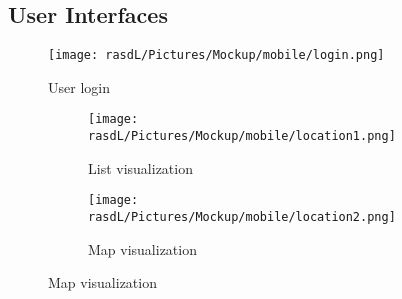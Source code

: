 \subsection{User Interfaces}

\begin{figure}[H]
\texttt{[image: rasdL/Pictures/Mockup/mobile/login.png]}
\centering
\captionsetup{labelformat=simple}
\caption{User login}
\end{figure}


\begin{figure}
  \begin{subfigure}[b]{0.4\textwidth}
    \texttt{[image: rasdL/Pictures/Mockup/mobile/location1.png]}
    \centering
    \captionsetup{labelformat=empty}
    \caption{List visualization}
    \label{fig:1}
  \end{subfigure}
  \begin{subfigure}[b]{0.4\textwidth}
    \texttt{[image: rasdL/Pictures/Mockup/mobile/location2.png]}
    \captionsetup{labelformat=empty}
    \caption{Map visualization}
    \label{fig:2}
  \end{subfigure}
\end{figure}




\iffalse

\begin{figure}[h]
\texttt{[image: usecase]}
\centering
\end{figure}

\fi


